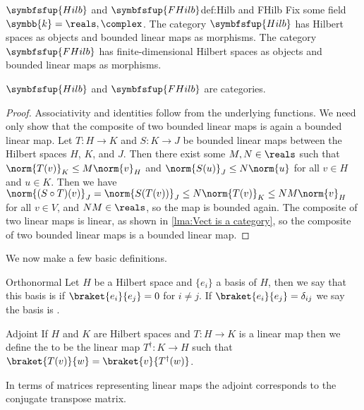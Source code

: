 \documentclass[fleqn]{NotesClass}
\makeatletter
\newcommand{\c@egory}[1]{\symbfsfup{#1}}
\renewcommand{\field}{\symbb{k}}
\newcommand{\Hilb}{\c@egory{Hilb}}
\newcommand{\FHilb}{\c@egory{FHilb}}
\renewcommand{\ve}[1]{e_{#1}}
\newcommand{\hermit}{\dagger}
\makeatother
\begin{document}
    \begin{dfn}{{\normalsize\(\Hilb\)} and {\normalsize\(\FHilb\)}}{def:Hilb and FHilb}
        Fix some field \(\field = \reals, \complex\).
        The category \(\Hilb\) has Hilbert spaces as objects and bounded linear maps as morphisms.
        The category \(\FHilb\) has finite-dimensional Hilbert spaces as objects and bounded linear maps as morphisms.
    \end{dfn}
    
    \begin{lma}{}{}
        \(\Hilb\) and \(\FHilb\) are categories.
        \begin{proof}
            Associativity and identities follow from the underlying functions.
            We need only show that the composite of two bounded linear maps is again a bounded linear map.
            Let \(T \colon H \to K\) and \(S \colon K \to J\) be bounded linear maps between the Hilbert spaces \(H\), \(K\), and \(J\).
            Then there exist some \(M, N \in \reals\) such that \(\norm{T(v)}_K \le M\norm{v}_H\) and \(\norm{S(u)}_J \le N\norm{u}\) for all \(v \in H\) and \(u \in K\).
            Then we have \(\norm{(S \circ T)(v)}_J = \norm{S(T(v))}_J \le N\norm{T(v)}_K \le NM\norm{v}_H\) for all \(v \in V\), and \(NM \in \reals\), so the map is bounded again.
            The composite of two linear maps is linear, as shown in \cref{lma:Vect is a category},
            so the composite of two bounded linear maps is a bounded linear map.
        \end{proof}
    \end{lma}
    
    We now make a few basic definitions.
    \begin{dfn}{Orthonormal}{}
        Let \(H\) be a Hilbert space and \(\{\ve{i}\}\) a basis of \(H\), then we say that this basis is  if \(\braket{\ve{i}}{\ve{j}} = 0\) for \(i \ne j\).
        If \(\braket{\ve{i}}{\ve{j}} = \delta_{ij}\) we say the basis is .
    \end{dfn}
    
    \begin{dfn}{Adjoint}{}
        If \(H\) and \(K\) are Hilbert spaces and \(T \colon H \to K\) is a linear map then we define the  to be the linear map \(T^{\hermit} \colon K \to H\) such that \(\braket{T(v)}{w} = \braket{v}{T^\hermit(w)}\).
    \end{dfn}
    
    In terms of matrices representing linear maps the adjoint corresponds to the conjugate transpose matrix.
    
\end{document}
